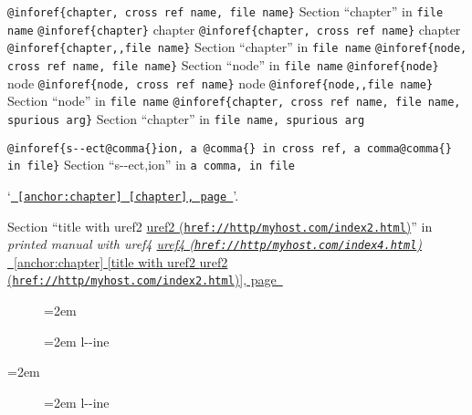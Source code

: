 \documentclass{book}
\newenvironment{GNUTexinfopreformatted}{%
  \par\begingroup\obeylines\obeyspaces\frenchspacing}{\endgroup}
\begin{document}
\begin{GNUTexinfopreformatted}
\texttt{@inforef\{chapter, cross ref name, file name\}} Section ``chapter'' in \texttt{file name}
\texttt{@inforef\{chapter\}} chapter
\texttt{@inforef\{chapter, cross ref name\}} chapter
\texttt{@inforef\{chapter,,file name\}} Section ``chapter'' in \texttt{file name}
\texttt{@inforef\{node, cross ref name, file name\}} Section ``node'' in \texttt{file name}
\texttt{@inforef\{node\}} node
\texttt{@inforef\{node, cross ref name\}} node
\texttt{@inforef\{node,,file name\}} Section ``node'' in \texttt{file name}
\texttt{@inforef\{chapter, cross ref name, file name, spurious arg\}} Section ``chapter'' in \texttt{file name, spurious arg}

\texttt{@inforef\{s{-}{-}ect@comma\{\}ion, a @comma\{\} in cross
ref, a comma@comma\{\} in file\}}
Section ``s{-}{-}ect,ion'' in \texttt{a comma, in file}

`\texttt{\hyperref[anchor:chapter]{\chaptername~\ref*{anchor:chapter} [chapter], page~\pageref*{anchor:chapter}}}'.

Section ``title with uref2 \href{href://http/myhost.com/index2.html}{uref2 (\nolinkurl{href://http/myhost.com/index2.html})}'' in \textsl{printed manual with uref4 \href{href://http/myhost.com/index4.html}{uref4 (\nolinkurl{href://http/myhost.com/index4.html})}}
\hyperref[anchor:chapter]{\chaptername~\ref*{anchor:chapter} [title with uref2 \href{href://http/myhost.com/index2.html}{uref2 (\nolinkurl{href://http/myhost.com/index2.html})}], page~\pageref*{anchor:chapter}}

\end{GNUTexinfopreformatted}
\begin{description}
\item[] \begin{GNUTexinfopreformatted}
\leftskip=2em \parskip=0pt \parindent=0pt \ttfamily%
\end{GNUTexinfopreformatted}
\item[{\parbox[b]{\linewidth}{%
\textbf{a--strong}}}]
\begin{GNUTexinfopreformatted}
\leftskip=2em \parskip=0pt \parindent=0pt \ttfamily%
l{-}{-}ine
\end{GNUTexinfopreformatted}
\end{description}
\begin{GNUTexinfopreformatted}
\leftskip=2em \parskip=0pt \parindent=0pt \ttfamily%

\end{GNUTexinfopreformatted}
\begin{description}
\item[{\parbox[b]{\linewidth}{%
a--asis\\
\index[cp]{a--asis@\texttt{a{-}{-}asis}}%
b
\index[cp]{b@\texttt{b}}%
}}]
\begin{GNUTexinfopreformatted}
\leftskip=2em \parskip=0pt \parindent=0pt \ttfamily%
l{-}{-}ine
\end{GNUTexinfopreformatted}
\end{description}
\end{document}
